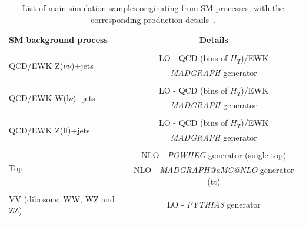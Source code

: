 \begin{table}[ht!]
    \centering
    \small
    \begin{tabular}{l  c }
        SM background process                                                  & Details    \\\hline
        & \\
        \multirow{2}{*}{QCD/EWK Z($\nu\nu$)+jets}                                                 &  LO - QCD (bins of $H_T$)/EWK    \\
                                                                                                 & \emph{MADGRAPH} generator\\
        & \\
        \multirow{2}{*}{QCD/EWK W(l$\nu$)+jets}                                                 &  LO - QCD (bins of $H_T$)/EWK\\
                                                                                                 & \emph{MADGRAPH} generator\\
        & \\
        \multirow{2}{*}{QCD/EWK Z(ll)+jets}                                                 &  LO - QCD (bins of $H_T$)/EWK\\
                                                                                                 & \emph{MADGRAPH} generator\\
        & \\
        \multirow{2}{*}{Top}                                                 &  NLO - \emph{POWHEG} generator (single top) \\
                                                                                                 &NLO - \emph{MADGRAPH@aMC@NLO} generator (t$\bar{\text{t}}$)\\
        & \\
            \multirow{1}{*}{VV (dibosons: WW, WZ and ZZ)}                                                 &  LO - \emph{PYTHIA8} generator\\
                                                                          
        & \\
        \hline 
    \end{tabular}
    \caption{List of main simulation samples originating from SM processes, with the corresponding production details~\cite{note:AN_19_257}.}
    \label{tab:samples}
\end{table}

